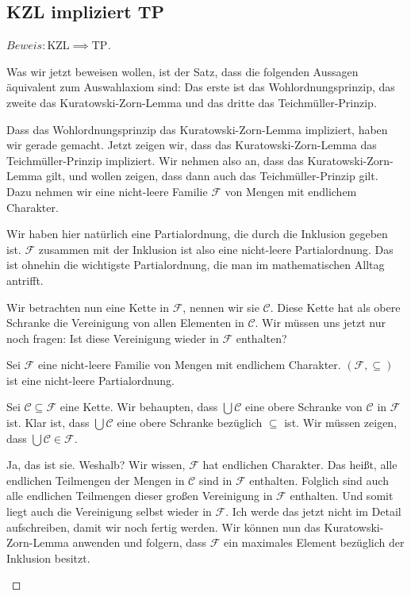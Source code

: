 \subsection{KZL impliziert TP}

\begin{proof}[$Beweis:\text{KZL} \implies \text{TP}$]
\begin{spoken-clean}[01:00:30 - 01:03:00]
Was wir jetzt beweisen wollen, ist der Satz, dass die folgenden Aussagen äquivalent zum Auswahlaxiom sind: Das erste ist das Wohlordnungsprinzip, das zweite das Kuratowski-Zorn-Lemma und das dritte das Teichmüller-Prinzip. 

Dass das Wohlordnungsprinzip das Kuratowski-Zorn-Lemma impliziert, haben wir gerade gemacht. Jetzt zeigen wir, dass das Kuratowski-Zorn-Lemma das Teichmüller-Prinzip impliziert. Wir nehmen also an, dass das Kuratowski-Zorn-Lemma gilt, und wollen zeigen, dass dann auch das Teichmüller-Prinzip gilt. Dazu nehmen wir eine nicht-leere Familie $\mathcal{F}$ von Mengen mit endlichem Charakter.

Wir haben hier natürlich eine Partialordnung, die durch die Inklusion gegeben ist. $\mathcal{F}$ zusammen mit der Inklusion ist also eine nicht-leere Partialordnung. Das ist ohnehin die wichtigste Partialordnung, die man im mathematischen Alltag antrifft.

Wir betrachten nun eine Kette in $\mathcal{F}$, nennen wir sie $\mathcal{C}$. Diese Kette hat als obere Schranke die Vereinigung von allen Elementen in $\mathcal{C}$. Wir müssen uns jetzt nur noch fragen: Ist diese Vereinigung wieder in $\mathcal{F}$ enthalten?
\end{spoken-clean}

\begin{math-stroke}
Sei $\mathcal{F}$ eine nicht-leere Familie von Mengen mit endlichem Charakter.
$(\mathcal{F}, \subseteq)$ ist eine nicht-leere Partialordnung.

Sei $\mathcal{C} \subseteq \mathcal{F}$ eine Kette.
Wir behaupten, dass $\bigcup \mathcal{C}$ eine obere Schranke von $\mathcal{C}$ in $\mathcal{F}$ ist.
Klar ist, dass $\bigcup \mathcal{C}$ eine obere Schranke bezüglich $\subseteq$ ist. Wir müssen zeigen, dass $\bigcup \mathcal{C} \in \mathcal{F}$.
\end{math-stroke}

\begin{spoken-clean}[01:03:00 - 01:05:00]
Ja, das ist sie. Weshalb? Wir wissen, $\mathcal{F}$ hat endlichen Charakter. Das heißt, alle endlichen Teilmengen der Mengen in $\mathcal{C}$ sind in $\mathcal{F}$ enthalten. Folglich sind auch alle endlichen Teilmengen dieser großen Vereinigung in $\mathcal{F}$ enthalten. Und somit liegt auch die Vereinigung selbst wieder in $\mathcal{F}$. Ich werde das jetzt nicht im Detail aufschreiben, damit wir noch fertig werden. Wir können nun das Kuratowski-Zorn-Lemma anwenden und folgern, dass $\mathcal{F}$ ein maximales Element bezüglich der Inklusion besitzt.
\end{spoken-clean}


\end{proof}
